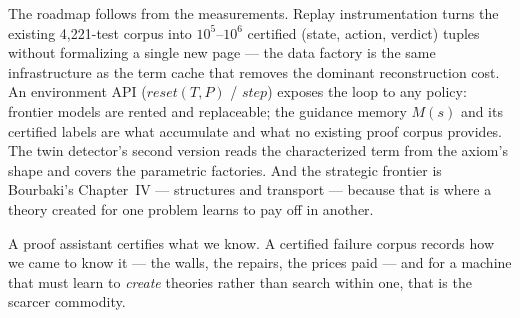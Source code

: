 \documentclass[11pt]{article}
\theoremstyle{remark}\newtheorem{example}{Example}
\begin{document}
The roadmap follows from the measurements. Replay instrumentation turns the existing
4{,}221-test corpus into $10^5$--$10^6$ certified (state, action, verdict) tuples
without formalizing a single new page --- the data factory is the same infrastructure
as the term cache that removes the dominant reconstruction cost. An environment API
($\mathit{reset}(T,P)$ / $\mathit{step}$) exposes the loop to any policy: frontier
models are rented and replaceable; the guidance memory $M(s)$ and its certified labels
are what accumulate and what no existing proof corpus provides. The twin detector's
second version reads the characterized term from the axiom's shape and covers the
parametric factories. And the strategic frontier is Bourbaki's Chapter~IV ---
structures and transport --- because that is where a theory created for one problem
learns to pay off in another.

A proof assistant certifies what we know. A certified failure corpus records how we
came to know it --- the walls, the repairs, the prices paid --- and for a machine that
must learn to \emph{create} theories rather than search within one, that is the
scarcer commodity.



\end{document}
